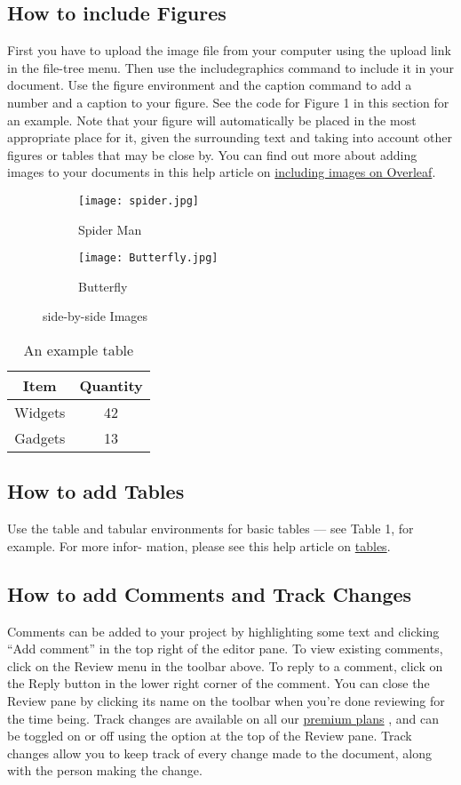 \documentclass{article}
\begin{document}
	\subsection{How to include Figures}
	First you have to upload the image file from your computer using the upload link in the file-tree menu.
	Then use the includegraphics command to include it in your document. Use the figure environment
	and the caption command to add a number and a caption to your figure. See the code for Figure 1 in
	this section for an example.
	Note that your figure will automatically be placed in the most appropriate place for it, given the
	surrounding text and taking into account other figures or tables that may be close by. You can find
	out more about adding images to your documents in this help article on \href{https://www.overleaf.com/learn/how-to/Including_images_on_Overleaf}{including images on Overleaf}.
	\begin{figure}
		\centering
		\begin{subfigure}[b]{0.5\textwidth}
			\centering
			\texttt{[image: spider.jpg]}
			\caption{Spider Man}
			\label {fig:img}
		\end{subfigure}
	    \begin{subfigure}[b]{0.5\textwidth}
	    	\centering	\texttt{[image: Butterfly.jpg]}
	    	\caption{Butterfly}\label{fig:ex}
		\end{subfigure}
	\caption {side-by-side Images}
	\label{fig:imgs}
	\end{figure}
\begin{table}
	\centering
	\caption{An example table}
	\begin{tabular}{|c|c|}
		\hline
		Item & Quantity\\
		\hline
		Widgets & 42\\
		Gadgets & 13\\
		\hline
		\end{tabular}
\end{table}
\subsection{How to add Tables}
Use the table and tabular environments for basic tables — see Table 1, for example. For more infor-
mation, please see this help article on \href{https://www.overleaf.com/learn/latex/Tables}{tables}.
\subsection{How to add Comments and Track Changes}
Comments can be added to your project by highlighting some text and clicking “Add comment” in
the top right of the editor pane. To view existing comments, click on the Review menu in the toolbar
above. To reply to a comment, click on the Reply button in the lower right corner of the comment.
You can close the Review pane by clicking its name on the toolbar when you’re done reviewing for the
time being.
Track changes are available on all our \href{https://www.overleaf.com/user/subscription/plans}{premium plans}
, and can be toggled on or off using the option
at the top of the Review pane. Track changes allow you to keep track of every change made to the
document, along with the person making the change.
\end{document}
